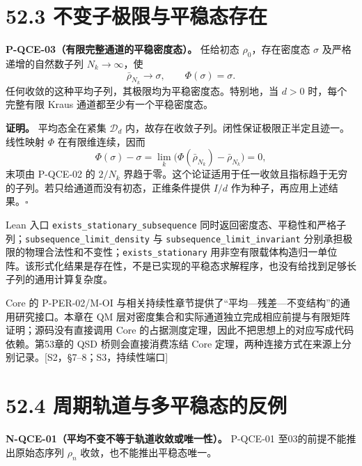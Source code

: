 \documentclass[
  11pt,
  oneside]{book}
\begin{document}
\hypertarget{ux4e0dux53d8ux5b50ux6781ux9650ux4e0eux5e73ux7a33ux6001ux5b58ux5728}{%
\section{52.3
不变子极限与平稳态存在}\label{ux4e0dux53d8ux5b50ux6781ux9650ux4e0eux5e73ux7a33ux6001ux5b58ux5728}}

\protect\hypertarget{p-qce-03}{}{}

\textbf{P-QCE-03（有限完整通道的平稳密度态）。} 任给初态
\(\rho_0\)，存在密度态 \(\sigma\) 及严格递增的自然数子列
\(N_k\to\infty\)，使 \[
\bar\rho_{N_k}\longrightarrow\sigma,\qquad \Phi(\sigma)=\sigma.
\] 任何收敛的这种平均子列，其极限均为平稳密度态。特别地，当 \(d>0\)
时，每个完整有限 Kraus 通道都至少有一个平稳密度态。

\textbf{证明。} 平均态全在紧集 \(\mathcal D_d\)
内，故存在收敛子列。闭性保证极限正半定且迹一。线性映射 \(\Phi\)
在有限维连续，因而 \[
\Phi(\sigma)-\sigma
=\lim_k\bigl(\Phi(\bar\rho_{N_k})-\bar\rho_{N_k}\bigr)=0,
\] 末项由 P-QCE-02 的 \(2/N_k\)
界趋于零。这个论证适用于任一收敛且指标趋于无穷的子列。若只给通道而没有初态，正维条件提供
\(I/d\) 作为种子，再应用上述结果。\(\square\)

Lean 入口 \texttt{exists\_\allowbreak stationary\_\allowbreak subsequence}
同时返回密度态、平稳性和严格子列；\texttt{subsequence\_\allowbreak limit\_\allowbreak density}
与 \texttt{subsequence\_\allowbreak limit\_\allowbreak invariant}
分别承担极限的物理合法性和不变性；\texttt{exists\_\allowbreak stationary}
用非空有限载体构造归一单位阵。该形式化结果是存在性，不是已实现的平稳态求解程序，也没有给找到足够长子列的通用计算复杂度。

Core 的 P-PER-02/M-OI
与相关持续性章节提供了``平均---残差---不变结构''的通用研究接口。本章在
QM
层对密度集合和实际通道独立完成相应前提与有限矩阵证明；源码没有直接调用
Core 的占据测度定理，因此不把思想上的对应写成代码依赖。第53章的 QSD
桥则会直接消费冻结 Core
定理，两种连接方式在来源上分别记录。{[}S2，§7--8；S3，持续性端口{]}

\hypertarget{ux5468ux671fux8f68ux9053ux4e0eux591aux5e73ux7a33ux6001ux7684ux53cdux4f8b}{%
\section{52.4
周期轨道与多平稳态的反例}\label{ux5468ux671fux8f68ux9053ux4e0eux591aux5e73ux7a33ux6001ux7684ux53cdux4f8b}}

\protect\hypertarget{n-qce-01}{}{}

\textbf{N-QCE-01（平均不变不等于轨道收敛或唯一性）。} P-QCE-01
至03的前提不能推出原始态序列 \(\rho_n\) 收敛，也不能推出平稳态唯一。
\end{document}
